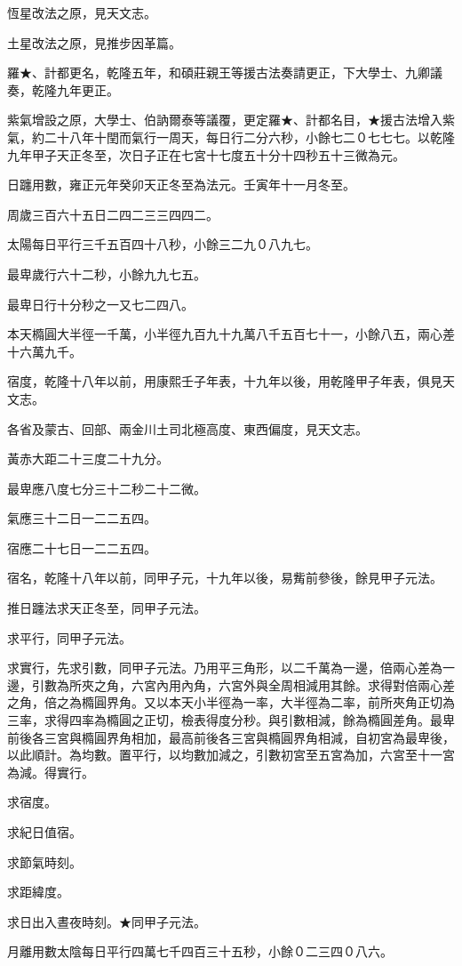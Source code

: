 \begin{pinyinscope}
恆星改法之原，見天文志。

土星改法之原，見推步因革篇。

羅★、計都更名，乾隆五年，和碩莊親王等援古法奏請更正，下大學士、九卿議奏，乾隆九年更正。

紫氣增設之原，大學士、伯訥爾泰等議覆，更定羅★、計都名目，★援古法增入紫氣，約二十八年十閏而氣行一周天，每日行二分六秒，小餘七二０七七七。以乾隆九年甲子天正冬至，次日子正在七宮十七度五十分十四秒五十三微為元。

日躔用數，雍正元年癸卯天正冬至為法元。壬寅年十一月冬至。

周歲三百六十五日二四二三三四四二。

太陽每日平行三千五百四十八秒，小餘三二九０八九七。

最卑歲行六十二秒，小餘九九七五。

最卑日行十分秒之一又七二四八。

本天橢圓大半徑一千萬，小半徑九百九十九萬八千五百七十一，小餘八五，兩心差十六萬九千。

宿度，乾隆十八年以前，用康熙壬子年表，十九年以後，用乾隆甲子年表，俱見天文志。

各省及蒙古、回部、兩金川土司北極高度、東西偏度，見天文志。

黃赤大距二十三度二十九分。

最卑應八度七分三十二秒二十二微。

氣應三十二日一二二五四。

宿應二十七日一二二五四。

宿名，乾隆十八年以前，同甲子元，十九年以後，易觜前參後，餘見甲子元法。

推日躔法求天正冬至，同甲子元法。

求平行，同甲子元法。

求實行，先求引數，同甲子元法。乃用平三角形，以二千萬為一邊，倍兩心差為一邊，引數為所夾之角，六宮內用內角，六宮外與全周相減用其餘。求得對倍兩心差之角，倍之為橢圓界角。又以本天小半徑為一率，大半徑為二率，前所夾角正切為三率，求得四率為橢圓之正切，檢表得度分秒。與引數相減，餘為橢圓差角。最卑前後各三宮與橢圓界角相加，最高前後各三宮與橢圓界角相減，自初宮為最卑後，以此順計。為均數。置平行，以均數加減之，引數初宮至五宮為加，六宮至十一宮為減。得實行。

求宿度。

求紀日值宿。

求節氣時刻。

求距緯度。

求日出入晝夜時刻。★同甲子元法。

月離用數太陰每日平行四萬七千四百三十五秒，小餘０二三四０八六。


\end{pinyinscope}
